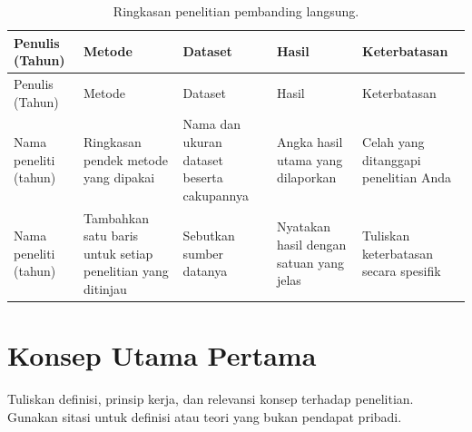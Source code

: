 %
%
%
\begin{xltabular}{\linewidth}{|L{0.70}|L{1.05}|L{1.20}|L{1.15}|L{0.90}|}
\caption{Ringkasan penelitian pembanding langsung.}\label{tab:penelitian-terdahulu}\\
\hline
Penulis (Tahun) & Metode & Dataset & Hasil & Keterbatasan \\
\hline
\endfirsthead
\hline
Penulis (Tahun) & Metode & Dataset & Hasil & Keterbatasan \\
\hline
\endhead
\hline
\endlastfoot
Nama peneliti (tahun) \cite{exampleReference} & Ringkasan pendek metode yang dipakai & Nama dan ukuran dataset beserta cakupannya & Angka hasil utama yang dilaporkan & Celah yang ditanggapi penelitian Anda \\
\hline
Nama peneliti (tahun) & Tambahkan satu baris untuk setiap penelitian yang ditinjau & Sebutkan sumber datanya & Nyatakan hasil dengan satuan yang jelas & Tuliskan keterbatasan secara spesifik \\
\end{xltabular}

\section{Konsep Utama Pertama}
Tuliskan definisi, prinsip kerja, dan relevansi konsep terhadap penelitian. Gunakan sitasi untuk definisi atau teori yang bukan pendapat pribadi.


